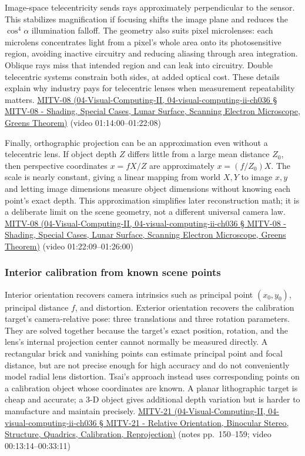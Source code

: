 Image-space telecentricity sends rays approximately perpendicular to the sensor. This stabilizes magnification if focusing shifts the image plane and reduces the \(\cos^4\alpha\) illumination falloff. The geometry also suits pixel microlenses: each microlens concentrates light from a pixel's whole area onto its photosensitive region, avoiding inactive circuitry and reducing aliasing through area integration. Oblique rays miss that intended region and can leak into circuitry. Double telecentric systems constrain both sides, at added optical cost. These details explain why industry pays for telecentric lenses when measurement repeatability matters. \href{}{MITV-08 (04-Visual-Computing-II, 04-visual-computing-ii-ch036 § MITV-08 - Shading, Special Cases, Lunar Surface, Scanning Electron Microscope, Green\textquotesingle s Theorem)} (video 01:14:00--01:22:08)

Finally, orthographic projection can be an approximation even without a telecentric lens. If object depth \(Z\) differs little from a large mean distance \(Z_0\), then perspective coordinates \(x=fX/Z\) are approximately \(x=(f/Z_0)X\). The scale is nearly constant, giving a linear mapping from world \(X,Y\) to image \(x,y\) and letting image dimensions measure object dimensions without knowing each point's exact depth. This approximation simplifies later reconstruction math; it is a deliberate limit on the scene geometry, not a different universal camera law. \href{}{MITV-08 (04-Visual-Computing-II, 04-visual-computing-ii-ch036 § MITV-08 - Shading, Special Cases, Lunar Surface, Scanning Electron Microscope, Green\textquotesingle s Theorem)} (video 01:22:09--01:26:00)

\subsubsection{Interior calibration from known scene points}\label{interior-calibration-from-known-scene-points}

Interior orientation recovers camera intrinsics such as principal point \((x_0,y_0)\), principal distance \(f\), and distortion. Exterior orientation recovers the calibration target's camera-relative pose: three translations and three rotation parameters. They are solved together because the target's exact position, rotation, and the lens's internal projection center cannot normally be measured directly. A rectangular brick and vanishing points can estimate principal point and focal distance, but are not precise enough for high accuracy and do not conveniently model radial lens distortion. Tsai's approach instead uses corresponding points on a calibration object whose coordinates are known. A planar lithographic target is cheap and accurate; a 3-D object gives additional depth variation but is harder to manufacture and maintain precisely. \href{}{MITV-21 (04-Visual-Computing-II, 04-visual-computing-ii-ch036 § MITV-21 - Relative Orientation, Binocular Stereo, Structure, Quadrics, Calibration, Reprojection)} (notes pp.~150--159; video 00:13:14--00:33:11)

